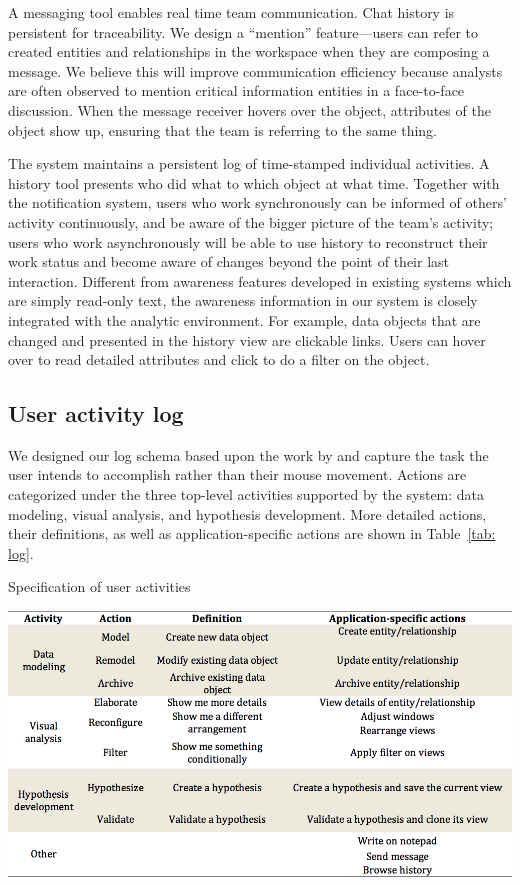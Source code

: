 A messaging tool enables real time team communication. Chat history is persistent
for traceability. We design a “mention” feature—users can refer to created
entities and relationships in the workspace when they are composing a message.
We believe this will improve communication efficiency because analysts are often
observed to mention critical information entities in a face-to-face discussion.
When the message receiver hovers over the object, attributes of the object show
up, ensuring that the team is referring to the same thing.

The system maintains a persistent log of time-stamped individual activities. A
history tool presents who did what to which object at what time. Together with the
notification system, users who work synchronously can be informed of others’
activity continuously, and be aware of the bigger picture of the team’s activity;
users who work asynchronously will be able to use history to reconstruct
their work status and become aware of changes beyond the point of their last
interaction. Different from awareness features developed in existing systems
which are simply read-only text, the awareness information in our system is
closely integrated with the analytic environment. For example, data objects that
are changed and presented in the history view are clickable links. Users can
hover over to read detailed attributes and click to do a filter on the object.

\subsection{User activity log}\label{activity-og}

We designed our log schema based upon the work by \cite{Yi2007} and
 capture the
task the user intends to accomplish rather than their mouse movement. Actions
are categorized under the three top-level activities supported by the system:
data modeling, visual analysis, and hypothesis development. More detailed
actions, their definitions, as well as application-specific actions are shown in
Table~\ref{tab: log}.

\begin{table}
	\caption{Specification of user activities}
	\label{tab: log}
	\includegraphics[width=\linewidth]{03-System/img/log_specification.png}
\end{table}


